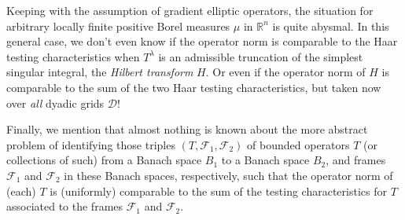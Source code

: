 \documentclass{amsart}%
\theoremstyle{plain}
\numberwithin{equation}{section}
\begin{document}
Keeping with the assumption of gradient elliptic operators, the situation for arbitrary locally finite positive Borel measures
$\mu$ in $\mathbb{R}^{n}$ is quite abysmal. In this general
case, we don't even know if the operator norm is comparable to the Haar testing characteristics
when $T^{\lambda}$ is an admissible truncation of the simplest singular integral, the
\emph{Hilbert transform} $H$. Or even if the operator norm of
$H$ is comparable to the sum of the two Haar testing characteristics, but
taken now over \emph{all} dyadic grids $\mathcal{D}$!

Finally, we mention that almost nothing is known about the more abstract problem of identifying those triples $\left(  T,\mathcal{F}%
_{1},\mathcal{F}_{2}\right)  $ of bounded operators $T$ (or collections of
such) from a Banach space $B_{1}$ to a Banach space $B_{2}$, and frames
$\mathcal{F}_{1}$ and $\mathcal{F}_{2}$ in these Banach spaces, respectively,
such that the operator norm of (each) $T$ is (uniformly) comparable to the sum
of the testing characteristics for $T$ associated to the frames
$\mathcal{F}_{1}$ and $\mathcal{F}_{2}$.
\end{document}
